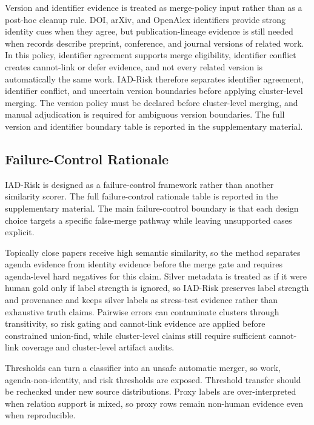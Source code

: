 \documentclass[11pt]{article}
\begin{document}
Version and identifier evidence is treated as merge-policy input rather than as a post-hoc cleanup rule. DOI, arXiv, and OpenAlex identifiers provide strong identity cues when they agree, but publication-lineage evidence is still needed when records describe preprint, conference, and journal versions of related work. In this policy, identifier agreement supports merge eligibility, identifier conflict creates cannot-link or defer evidence, and not every related version is automatically the same work. IAD-Risk therefore separates identifier agreement, identifier conflict, and uncertain version boundaries before applying cluster-level merging. The version policy must be declared before cluster-level merging, and manual adjudication is required for ambiguous version boundaries. The full version and identifier boundary table is reported in the supplementary material.

\subsection{Failure-Control Rationale}

IAD-Risk is designed as a failure-control framework rather than another similarity scorer. The full failure-control rationale table is reported in the supplementary material. The main failure-control boundary is that each design choice targets a specific false-merge pathway while leaving unsupported cases explicit.

Topically close papers receive high semantic similarity, so the method separates agenda evidence from identity evidence before the merge gate and requires agenda-level hard negatives for this claim. Silver metadata is treated as if it were human gold only if label strength is ignored, so IAD-Risk preserves label strength and provenance and keeps silver labels as stress-test evidence rather than exhaustive truth claims. Pairwise errors can contaminate clusters through transitivity, so risk gating and cannot-link evidence are applied before constrained union-find, while cluster-level claims still require sufficient cannot-link coverage and cluster-level artifact audits.

Thresholds can turn a classifier into an unsafe automatic merger, so work, agenda-non-identity, and risk thresholds are exposed. Threshold transfer should be rechecked under new source distributions. Proxy labels are over-interpreted when relation support is mixed, so proxy rows remain non-human evidence even when reproducible.
\end{document}
